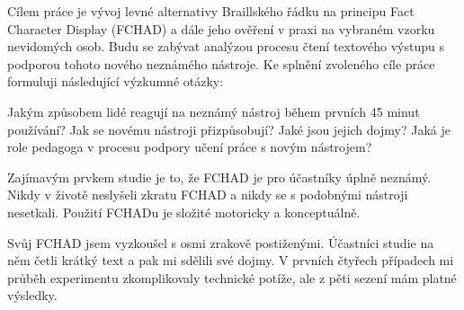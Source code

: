 Cílem práce je vývoj levné alternativy Braillského řádku na principu Fact Character Display (FCHAD) a dále jeho ověření v praxi na vybraném vzorku nevidomých osob. Budu se zabývat analýzou procesu čtení textového výstupu s podporou tohoto nového neznámého nástroje. Ke splnění zvoleného cíle práce formuluji následující výzkumné otázky:

Jakým způsobem lidé reagují na neznámý nástroj během prvních 45 minut používání?  Jak se novému nástroji přizpůsobují?  Jaké jsou jejich dojmy? Jaká je role pedagoga v procesu podpory učení práce s novým nástrojem?

Zajímavým prvkem studie je to, že FCHAD je pro účastníky úplně neznámý.  Nikdy v životě neslyšeli zkratu FCHAD a nikdy se s podobnými nástroji nesetkali.  Použití FCHADu je složité motoricky a konceptuálně.

Svůj FCHAD jsem vyzkoušel s osmi zrakově postiženými. Účastníci studie na něm četli krátký text a pak mi sdělili své dojmy.  V prvních čtyřech případech mi průběh experimentu zkomplikovaly technické potíže, ale z pěti sezení mám platné výsledky.
